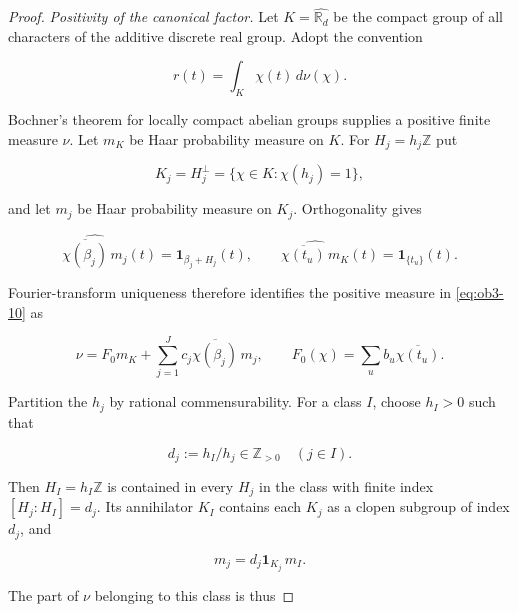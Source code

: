\begin{proof}\textit{Positivity of the canonical factor.} Let \(K=\widehat{\mathbb R_d}\) be the compact group of all characters of the additive discrete real group. Adopt the convention

\begin{equation}\label{eq:ob3-10}
r(t)=\int_K\chi(t)\,d\nu(\chi).
\end{equation}

Bochner's theorem for locally compact abelian groups \citep[Theorem~12.3]{korner2008} supplies a positive finite measure \(\nu\). Let \(m_K\) be Haar probability measure on \(K\). For \(H_j=h_j\mathbb Z\) put

\begin{equation}\label{eq:ob3-11}
K_j=H_j^\perp=\{\chi\in K:\chi(h_j)=1\},
\end{equation}

and let \(m_j\) be Haar probability measure on \(K_j\). Orthogonality gives

\begin{equation}\label{eq:ob3-12}
\widehat{\overline{\chi(\beta_j)}\,m_j}(t)
=\mathbf1_{\beta_j+H_j}(t),\qquad
\widehat{\overline{\chi(t_u)}\,m_K}(t)
=\mathbf1_{\{t_u\}}(t).
\end{equation}

Fourier-transform uniqueness therefore identifies the positive measure in \eqref{eq:ob3-10} as

\begin{equation}\label{eq:ob3-13}
\nu=F_0m_K+\sum_{j=1}^J
c_j\overline{\chi(\beta_j)}\,m_j,
\qquad
F_0(\chi)=\sum_u b_u\overline{\chi(t_u)}.
\end{equation}

Partition the \(h_j\) by rational commensurability. For a class \(I\), choose \(h_I>0\) such that

\begin{equation}\label{eq:ob3-14}
d_j:=h_I/h_j\in\mathbb Z_{>0}\quad(j\in I).
\end{equation}

Then \(H_I=h_I\mathbb Z\) is contained in every \(H_j\) in the class with finite index \([H_j:H_I]=d_j\). Its annihilator \(K_I\) contains each \(K_j\) as a clopen subgroup of index \(d_j\), and

\begin{equation}\label{eq:ob3-15}
m_j=d_j\mathbf1_{K_j}\,m_I.
\end{equation}

The part of \(\nu\) belonging to this class is thus


\end{proof}

